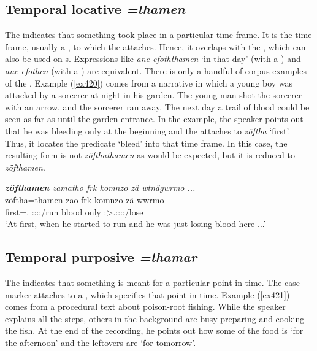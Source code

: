 \subsection{Temporal locative \emph{=thamen}} \label{temporallocativecase}  

The   indicates that something took place in a particular time frame. It is the time frame, usually a  , to which the   attaches. Hence, it overlaps with the  , which can also be used on  s. Expressions like \emph{ane efoththamen} `in that day' (with a  ) and \emph{ane efothen} (with a ) are equivalent. There is only a handful of corpus examples of the  . Example (\ref{ex420}) comes from a narrative in which a young boy was attacked by a sorcerer at night in his garden. The young man shot the sorcerer with an arrow, and the sorcerer ran away. The next day a trail of blood could be seen as far as until the garden entrance. In the example, the speaker points out that he was bleeding only at the beginning and the   attaches to \emph{zöftha} `first'. Thus, it locates the predicate `bleed' into that time frame. In this case, the resulting form is not \emph{zöfthathamen} as would be expected, but it is reduced to \emph{zöfthamen}.

\begin{exe}
	\ex \emph{\textbf{zöfthamen} zamatho frk komnzo zä wtnägwrmo ...}\\
	\gll zöftha=thamen zao frk komnzo zä wwrmo\\
	first=\Temp.{\Loc} \Sg:\Sbj:\Rpst:\Pfv:\Andat/run blood only {\Prox} \Sg:\Sbj>\Tsg.\F:\Obj:\Rpst:\Dur:\Andat/lose\\
	\trans `At first, when he started to run and he was just losing blood here ...'\\
	\label{ex420}
\end{exe}

\subsection{Temporal purposive \emph{=thamar}} \label{temporalpurposivecase}

The    indicates that something is meant for a particular point in time. The case marker attaches to a  , which specifies that point in time. Example (\ref{ex421}) comes from a procedural text about poison-root fishing. While the speaker explains all the steps, others in the background are busy preparing and cooking the fish. At the end of the recording, he points out how some of the food is `for the afternoon' and the leftovers are `for tomorrow'.

